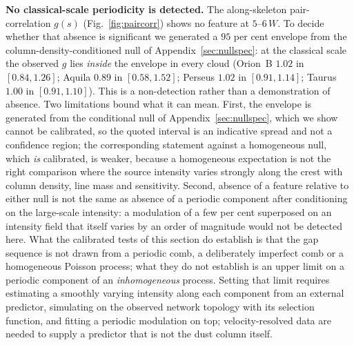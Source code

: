 \documentclass[usenatbib,twoside,twocolumn]{mnras}
\begin{document}
\smallskip\noindent\textbf{No classical-scale periodicity is detected.} The along-skeleton pair-correlation $g(s)$ (Fig.~\ref{fig:paircorr}) shows no feature at $5$--$6\,W$. To decide whether that absence is significant we generated a $95$ per cent envelope from the column-density-conditioned null of Appendix~\ref{sec:nullspec}: at the classical scale the observed $g$ lies \emph{inside} the envelope in every cloud (Orion~B $1.02$ in $[0.84,1.26]$; Aquila $0.89$ in $[0.58,1.52]$; Perseus $1.02$ in $[0.91,1.14]$; Taurus $1.00$ in $[0.91,1.10]$). This is a non-detection rather than a demonstration of absence. Two limitations bound what it can mean. First, the envelope is generated from the conditional null of Appendix~\ref{sec:nullspec}, which we show cannot be calibrated, so the quoted interval is an indicative spread and not a confidence region; the corresponding statement against a homogeneous null, which \emph{is} calibrated, is weaker, because a homogeneous expectation is not the right comparison where the source intensity varies strongly along the crest with column density, line mass and sensitivity. Second, absence of a feature relative to either null is not the same as absence of a periodic component after conditioning on the large-scale intensity: a modulation of a few per cent superposed on an intensity field that itself varies by an order of magnitude would not be detected here. What the calibrated tests of this section do establish is that the gap sequence is not drawn from a periodic comb, a deliberately imperfect comb or a homogeneous Poisson process; what they do not establish is an upper limit on a periodic component of an \emph{inhomogeneous} process. Setting that limit requires estimating a smoothly varying intensity along each component from an external predictor, simulating on the observed network topology with its selection function, and fitting a periodic modulation on top; velocity-resolved data are needed to supply a predictor that is not the dust column itself.
\end{document}
